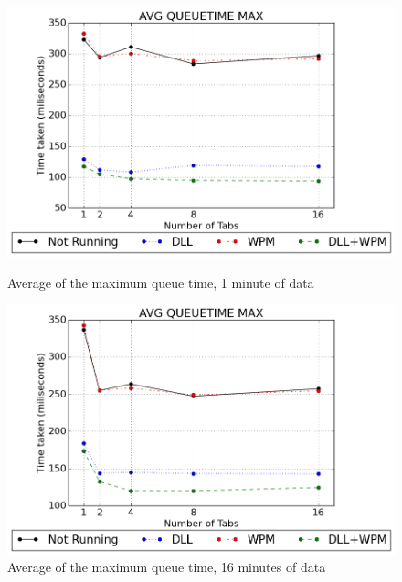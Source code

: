 \begin{figure}[h]
	\centering
    \includegraphics[width=\textwidth,height=0.45\textheight,keepaspectratio]{Evaluation/experiment1/AVG-QUEUETIME-MAX-1.png}
    \caption{Average of the maximum queue time, 1 minute of data}
    \label{fig:ex1_avgqueuetimemax_1}

	\vspace*{\floatsep}

    \includegraphics[width=\textwidth,height=0.45\textheight,keepaspectratio]{Evaluation/experiment1/AVG-QUEUETIME-MAX-16.png}
    \caption{Average of the maximum queue time, 16 minutes of data}
    \label{fig:ex1_avgqueuetimemax_16}
\end{figure}
